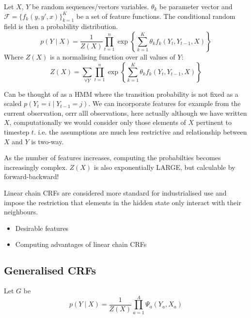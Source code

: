 \documentclass[../main.tex]{subfiles}
\begin{document}
\begin{definition}
    Let $X$, $Y$ be random sequences/vectors variables.
    $\theta_k$ be parameter vector and $\mathcal{F} = \{ f_k (y,y',x) \}_{k=1}^K$ be a set of feature functions.
    The conditional random field is then a probability distribution.
    \begin{equation*}
        p(Y \mid X) = \frac{1}{Z(X)} \prod_{t=1}^{n} \exp \left\{ \sum_{k=1}^K \theta_k f_k (Y_t, Y_{t-1}, X) \right\}
    \end{equation*}
    Where $Z(X)$ is a normalising function over all values of $Y$:
    \begin{equation*}
        Z(X) = \sum_{\forall Y} \prod_{t=1}^{n} \exp \left\{ \sum_{k=1}^K \theta_k f_k (Y_t, Y_{t-1}, X) \right\}
    \end{equation*}
\end{definition}

Can be thought of as a HMM where the transition probability is not fixed as a scaled $p (Y_t = i \mid Y_{t-1} = j)$. We can incorporate features for example from the current observation, orrr alll observations, here actually although we have written $X$, computationally we would consider only those elements of $X$ pertinent to timestep $t$.
i.e. the assumptions are much less restrictive and relationship between $X$ and $Y$ is two-way.

As the number of features increases, computing the probabilties becomes increasingly complex.
$Z(X)$ is also exponentially LARGE, but calculable by forward-backward!

Linear chain CRFs are considered more standard for industrialised use and impose the restriction that elements in the hidden state only interact with their neighbours.

\begin{itemize}
    \item Desirable features
    \item Computing advantages of linear chain CRFs
\end{itemize}

\subsection{Generalised CRFs}

\begin{definition}
    Let $G$ be
    \begin{equation*}
        p (Y \mid X) = \frac{1}{Z(X)} \prod_{a=1}^A \Psi_a (Y_a, X_a)
    \end{equation*}

\end{definition}
\end{document}
